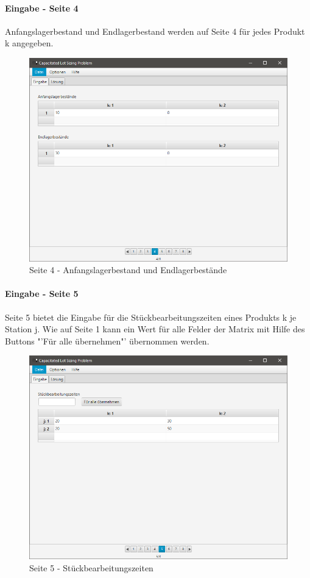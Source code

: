 \documentclass[12pt,a4paper, listof=entryprefix, bibliography=totocnumbered,toc=listofnumbered,lof=listofnumbered]{scrartcl}
\begin{document}
\pagebreak

\paragraph{Eingabe - Seite 4}
Anfangslagerbestand und Endlagerbestand werden auf Seite 4 für jedes Produkt k angegeben.

\begin{figure}[H]
	\centering
	\includegraphics[width=.8\linewidth]{images/seite4.png} 
	\caption{Seite 4 - Anfangslagerbestand und Endlagerbestände}
	\label{fig:seite4}
\end{figure}

\pagebreak

\paragraph{Eingabe - Seite 5}
Seite 5 bietet die Eingabe für die Stückbearbeitungszeiten eines Produkts k je Station j. Wie auf Seite 1 kann ein Wert für alle Felder der Matrix mit Hilfe des Buttons "'Für alle übernehmen"' übernommen werden.

\begin{figure}[H]
	\centering
	\includegraphics[width=.8\linewidth]{images/seite5.png} 
	\caption{Seite 5 - Stückbearbeitungszeiten}
	\label{fig:seite5}
\end{figure}
\end{document}
